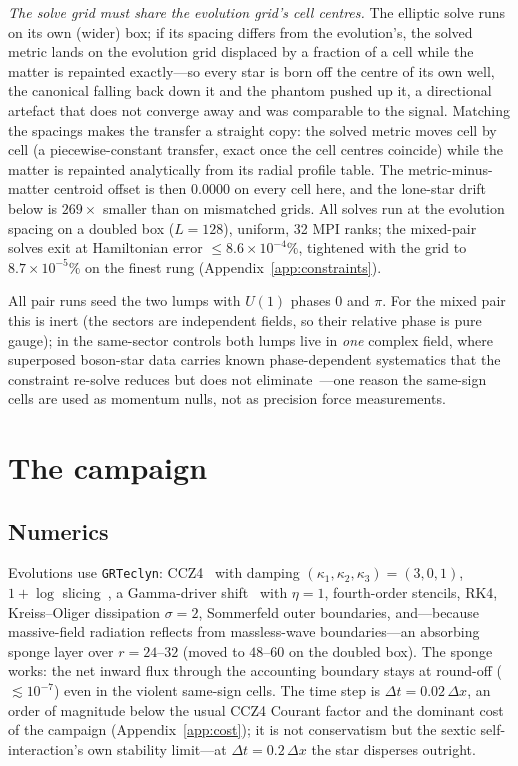 \documentclass[twocolumn,floatfix,aps,prd,nofootinbib]{revtex4-2}
\begin{document}
\emph{The solve grid must share the evolution grid's cell centres.} The elliptic solve runs on its own (wider) box; if its spacing differs from the evolution's, the solved metric lands on the evolution grid displaced by a fraction of a cell while the matter is repainted exactly---so every star is born off the centre of its own well, the canonical falling back down it and the phantom pushed up it, a directional artefact that does not converge away and was comparable to the signal. Matching the spacings makes the transfer a straight copy: the solved metric moves cell by cell (a piecewise-constant transfer, exact once the cell centres coincide) while the matter is repainted analytically from its radial profile table. The metric-minus-matter centroid offset is then $0.0000$ on every cell here, and the lone-star drift below is $269\times$ smaller than on mismatched grids. All solves run at the evolution spacing on a doubled box ($L=128$), uniform, 32 MPI ranks; the mixed-pair solves exit at Hamiltonian error $\le8.6\times10^{-4}\%$, tightened with the grid to $8.7\times10^{-5}\%$ on the finest rung (Appendix~\ref{app:constraints}).

All pair runs seed the two lumps with $U(1)$ phases $0$ and $\pi$. For the mixed pair this is inert (the sectors are independent fields, so their relative phase is pure gauge); in the same-sector controls both lumps live in \emph{one} complex field, where superposed boson-star data carries known phase-dependent systematics that the constraint re-solve reduces but does not eliminate~\cite{helfer2022}---one reason the same-sign cells are used as momentum nulls, not as precision force measurements.

\section{The campaign}
\label{sec:setup}

\subsection{Numerics}

Evolutions use \texttt{GRTeclyn}: CCZ4~\cite{alic2012} with damping $(\kappa_1,\kappa_2,\kappa_3)=(3,0,1)$, $1{+}\log$ slicing~\cite{bona1995}, a Gamma-driver shift~\cite{campanelli2006,baker2006} with $\eta=1$, fourth-order stencils, RK4, Kreiss--Oliger dissipation $\sigma=2$, Sommerfeld outer boundaries, and---because massive-field radiation reflects from massless-wave boundaries---an absorbing sponge layer over $r=24$--$32$ (moved to $48$--$60$ on the doubled box). The sponge works: the net inward flux through the accounting boundary stays at round-off ($\lesssim10^{-7}$) even in the violent same-sign cells. The time step is $\Delta t=0.02\,\Delta x$, an order of magnitude below the usual CCZ4 Courant factor and the dominant cost of the campaign (Appendix~\ref{app:cost}); it is not conservatism but the sextic self-interaction's own stability limit---at $\Delta t=0.2\,\Delta x$ the star disperses outright.
\end{document}
